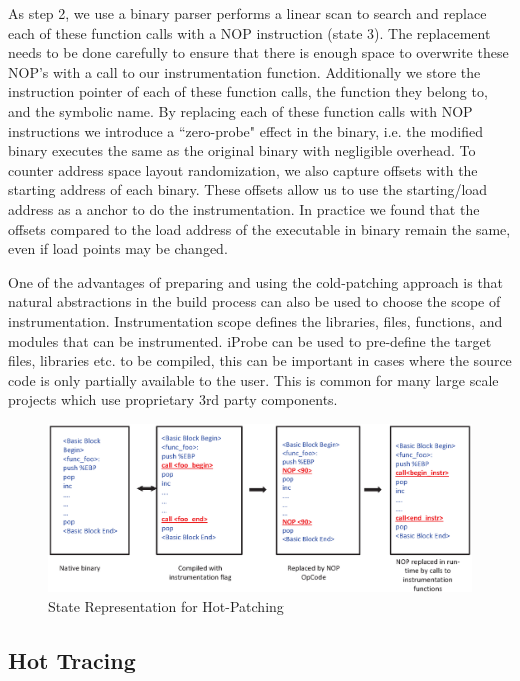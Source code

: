 As step 2, we use a binary parser performs a linear scan to search and replace each of these function calls with a NOP instruction (state 3). The replacement needs to be done carefully to ensure that there is enough space to overwrite these NOP's with a call to our instrumentation function. Additionally we store the instruction pointer of each of these function calls, the function they belong to, and the symbolic name. By replacing each of these function calls with NOP instructions we introduce a ``zero-probe" effect in the binary, i.e. the modified binary executes the same as the original binary with negligible overhead.
To counter address space layout randomization, we also capture offsets with the starting address of each binary. 
These offsets allow us to use the starting/load address as a anchor to do the instrumentation. In practice we found that the offsets compared to the load address of the executable in binary remain the same, even if load points may be changed.

One of the advantages of preparing and using the cold-patching approach is that natural abstractions in the build process can also be used to choose the scope of instrumentation. Instrumentation scope defines the libraries, files, functions, and modules that can be instrumented. iProbe can be used to pre-define the target files, libraries etc. to be compiled, this can be important in cases where the source code is only partially available to the user. This is common for many large scale projects which use proprietary 3rd party components.


\begin{figure}[htb]
  \begin{center}
    \includegraphics[totalheight=6cm]
    {Images/state-diagram.eps}
    \caption{State Representation for Hot-Patching}
    \label{fig:state_rep}
  \end{center}
\end{figure}

\subsection{Hot Tracing}
\label{sec:hottracing}



